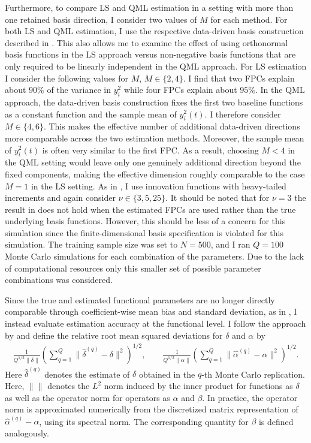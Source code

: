 \documentclass[12pt,a4paper]{article}
\theoremstyle{definition}
\begin{document}
Furthermore, to compare LS and QML estimation in a setting with more than one retained basis direction, I consider two values of $M$ for each method. For both LS and QML estimation, I use the respective data-driven basis construction described in . This also allows me to examine the effect of using orthonormal basis functions in the LS approach versus non-negative basis functions that are only required to be linearly independent in the QML approach. For LS estimation I consider the following values for $M$, $M \in \{2,4\}$. I find that two FPCs explain about $90\%$ of the variance in $y_i^2$ while four FPCs explain about $95\%$. In the QML approach, the data-driven basis construction fixes the first two baseline functions as a constant function and the sample mean of $y_i^2(t)$. I therefore consider $M\in \{4,6\}$. This makes the effective number of additional data-driven directions more comparable across the two estimation methods. Moreover, the sample mean of $y_i^2(t)$ is often very similar to the first FPC. As a result, choosing $M<4$ in the QML setting would leave only one genuinely additional direction beyond the fixed components, making the effective dimension roughly comparable to the case $M=1$ in the LS setting. As in , I use innovation functions with heavy-tailed increments and again consider $\nu \in \{3,5,25\}$. It should be noted that for $\nu=3$ the result in  does not hold when the estimated FPCs are used rather than the true underlying basis functions. However, this should be less of a concern for this simulation since the finite-dimensional basis specification is violated for this simulation. The training sample size was set to $N=500$, and I ran $Q=100$ Monte Carlo simulations for each combination of the parameters. Due to the lack of computational resources only this smaller set of possible parameter combinations was considered.

Since the true and estimated functional parameters are no longer directly comparable through coefficient-wise mean bias and standard deviation, as in , I instead evaluate estimation accuracy at the functional level. I follow the approach by \citeauthor{Cerovecki2019} and define the relative root mean squared deviations for $\delta$ and $\alpha$ by
\begin{gather}
    \frac{1}{Q^{1/2}\|\delta\|}
\left(
\sum_{q=1}^{Q} \|\hat{\delta}^{(q)} - \delta\|^2
\right)^{1/2},
\qquad
\frac{1}{Q^{1/2}\|\alpha\|}
\left(
\sum_{q=1}^{Q} \|\hat{\alpha}^{(q)} - \alpha\|^2
\right)^{1/2}.
\end{gather}
Here $\hat{\delta}^{(q)}$ denotes the estimate of $\delta$ obtained in the $q$-th Monte Carlo replication. Here, $\| \|$ denotes the $L^2$ norm induced by the inner product for functions as $\delta$ as well as the operator norm for operators as $\alpha$ and $\beta$. In practice, the operator norm is approximated numerically from the discretized matrix representation of $\hat{\alpha}^{(q)} - \alpha$, using its spectral norm. The corresponding quantity for $\beta$ is defined analogously.
\end{document}
